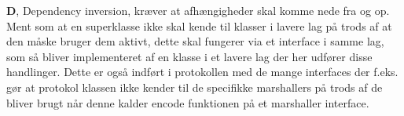 \textbf{D}, Dependency inversion, kræver at afhængigheder skal komme nede fra og op. Ment som at en superklasse ikke skal kende til klasser i lavere lag på trods af at den måske bruger dem aktivt, dette skal fungerer via et interface i samme lag, som så bliver implementeret af en klasse i et lavere lag der her udfører disse handlinger. Dette er også indført i protokollen med de mange interfaces der f.eks. gør at protokol klassen ikke kender til de specifikke marshallers på trods af de bliver brugt når denne kalder encode funktionen på et marshaller interface. \\ 



